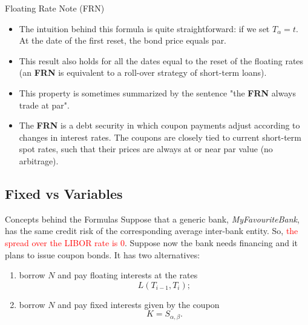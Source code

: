 \documentclass{beamer}
\begin{document}
\begin{frame}{Floating Rate Note (FRN)}
	\begin{itemize}
	\item The intuition behind this formula is quite straightforward: if we set $T_\alpha =t$. At the date of the first reset, the bond price equals par. 
	\item This result also holds for all the dates equal to the reset of the floating rates (an \textbf{FRN} is equivalent to a roll-over strategy of short-term loans).
	\item This property is sometimes summarized by the sentence "the \textbf{FRN} always trade at par".
	\item The \textbf{FRN} is a debt security in which coupon payments adjust according to changes in interest rates. The coupons are closely tied to current short-term spot rates, such that their prices are always at or near par value (no arbitrage). 
	\end{itemize}
\end{frame}

\subsection{Fixed vs Variables}
\begin{frame}{Concepts behind the Formulas}
	Suppose that a generic bank, \emph{MyFavouriteBank}, has the same credit risk of the corresponding average inter-bank entity. So, \textcolor{red}{the spread over the LIBOR rate is 0}. Suppose now the bank needs financing and it plans to issue coupon bonds. It has two alternatives:
	\begin{enumerate}
		\item<2-> borrow $N$ and pay floating interests at the rates
		\begin{equation*}
			L(T_{i-1},T_i);
		\end{equation*}
		\item<3-> borrow $N$ and pay fixed interests given by the coupon
		\begin{equation*}
			K = S_{\alpha,\beta}.
		\end{equation*}
	\end{enumerate}
\end{frame}
\end{document}

